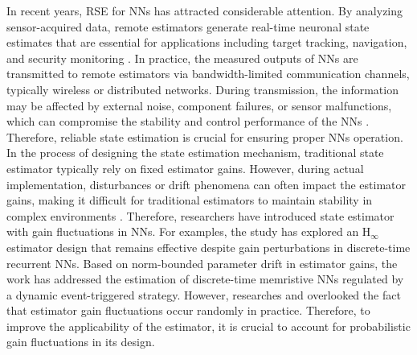 \documentclass[preprint,review,fleqn,sort&compress,3p]{elsarticle}
\theoremstyle{definition}%
\begin{document}
	In recent years, RSE for NNs has attracted considerable attention. By analyzing sensor-acquired data, remote estimators generate real-time neuronal state estimates that are essential for applications including target tracking, navigation, and security monitoring \cite{cai2022remote}. In practice, the measured outputs of NNs are transmitted to remote estimators via bandwidth-limited communication channels, typically wireless or distributed networks. During transmission, the information may be affected by external noise, component failures, or sensor malfunctions, which can compromise the stability and control performance of the NNs \cite{zhang2024state,zha2024statea}. Therefore, reliable state estimation is crucial for ensuring proper NNs operation. In the process of designing the state estimation mechanism, traditional state estimator typically rely on fixed estimator gains. However, during actual implementation, disturbances or drift phenomena can often impact the estimator gains, making it difficult for traditional estimators to maintain stability in complex environments \cite{cheng2024proportionalintegral,yang2024protocolbased}. Therefore, researchers have introduced state estimator with gain fluctuations in NNs. For examples, the study \cite{zhao2021nonfragile} has explored an $\text{H}_\infty$ estimator design that remains effective despite gain perturbations in discrete-time recurrent NNs. Based on norm-bounded parameter drift in estimator gains, the work \cite{liu2022resilient} has addressed the estimation of discrete-time memristive NNs regulated by a dynamic event-triggered strategy. However, researches \cite{zhao2021nonfragile} and \cite{liu2022resilient} overlooked the fact that estimator gain fluctuations occur randomly in practice. Therefore, to improve the applicability of the estimator, it is crucial to account for probabilistic gain fluctuations in its design.
	
\end{document}
